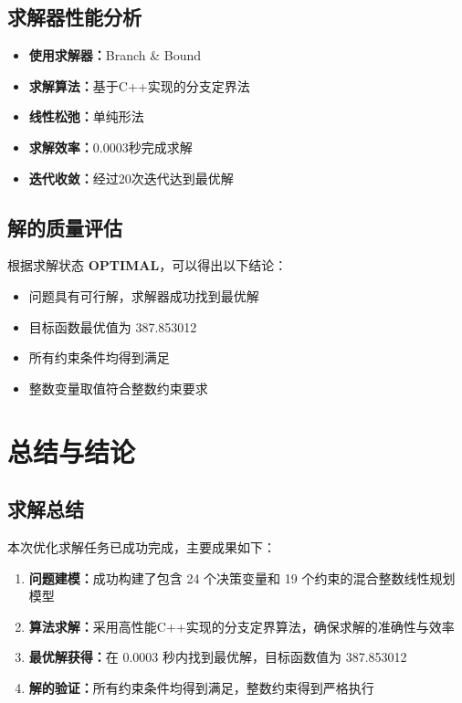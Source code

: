 \documentclass[12pt,a4paper]{article}
\begin{document}
\subsection{求解器性能分析}

\begin{itemize}
\item \textbf{使用求解器：}Branch \& Bound
\item \textbf{求解算法：}基于C++实现的分支定界法
\item \textbf{线性松弛：}单纯形法
\item \textbf{求解效率：}0.0003秒完成求解
\item \textbf{迭代收敛：}经过20次迭代达到最优解
\end{itemize}

\subsection{解的质量评估}

根据求解状态 \textbf{OPTIMAL}，可以得出以下结论：

\begin{itemize}
\item 问题具有可行解，求解器成功找到最优解
\item 目标函数最优值为 387.853012
\item 所有约束条件均得到满足
\item 整数变量取值符合整数约束要求
\end{itemize}

\section{总结与结论}

\subsection{求解总结}

本次优化求解任务已成功完成，主要成果如下：

\begin{enumerate}
\item \textbf{问题建模：}成功构建了包含 24 个决策变量和 19 个约束的混合整数线性规划模型
\item \textbf{算法求解：}采用高性能C++实现的分支定界算法，确保求解的准确性与效率
\item \textbf{最优解获得：}在 0.0003 秒内找到最优解，目标函数值为 387.853012
\item \textbf{解的验证：}所有约束条件均得到满足，整数约束得到严格执行
\end{enumerate}
\end{document}
